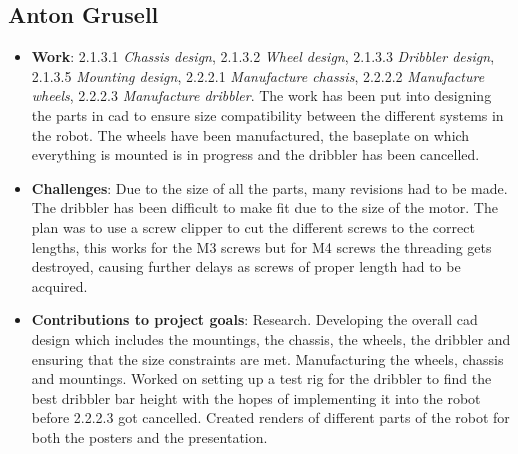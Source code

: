 \subsection*{Anton Grusell}
\begin{itemize}
    \item \textbf{Work}: 2.1.3.1 \textit{Chassis design}, 2.1.3.2 \textit{Wheel design}, 2.1.3.3 \textit{Dribbler design}, 2.1.3.5 \textit{Mounting design}, 2.2.2.1 \textit{Manufacture chassis}, 2.2.2.2 \textit{Manufacture wheels}, 2.2.2.3 \textit{Manufacture dribbler}. The work has been put into designing the parts in \ac{cad} to ensure size compatibility between the different systems in the robot. The wheels have been manufactured, the baseplate on which everything is mounted is in progress and the dribbler has been cancelled.
    \item \textbf{Challenges}: Due to the size of all the parts, many revisions had to be made. The dribbler has been difficult to make fit due to the size of the motor. The plan was to use a screw clipper to cut the different screws to the correct lengths, this works for the M3 screws but for M4 screws the threading gets destroyed, causing further delays as screws of proper length had to be acquired.
    \item \textbf{Contributions to project goals}: Research. Developing the overall \ac{cad} design which includes the mountings, the chassis, the wheels, the dribbler and ensuring that the size constraints are met. Manufacturing the wheels, chassis and mountings. Worked on setting up a test rig for the dribbler to find the best dribbler bar height with the hopes of implementing it into the robot before 2.2.2.3 got cancelled. Created renders of different parts of the robot for both the posters and the presentation.
\end{itemize}
